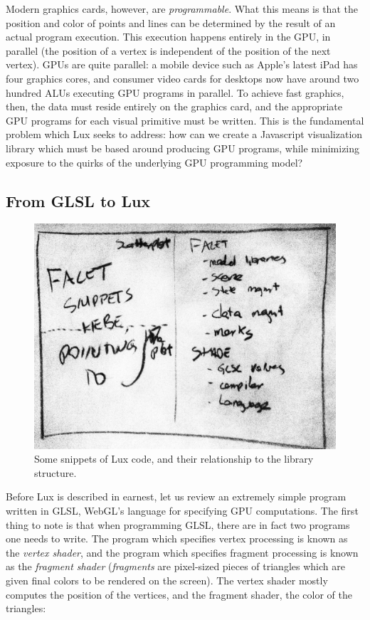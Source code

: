 Modern graphics cards, however, are \emph{programmable}. What this
means is that the position and color of points and lines can be
determined by the result of an actual program execution. This
execution happens entirely in the GPU, in parallel (the
position of a vertex is independent of the position of the next
vertex). GPUs are quite parallel: a mobile device
such as Apple's latest iPad has four graphics cores, and consumer
video cards for desktops now have around two hundred ALUs executing GPU programs in
parallel. To achieve fast graphics, then, the data must reside
entirely on the graphics card, and the appropriate GPU programs for each visual
primitive must be written. This is the fundamental problem
which Lux seeks to address: how can we create a Javascript
visualization library which must be based around producing
GPU programs, while minimizing exposure to the quirks of the
underlying GPU programming model?

\subsection{From GLSL to Lux}

\begin{figure}
\includegraphics[width=\linewidth]{fig/snippet_overview/overview.jpg}
\caption{Some snippets of Lux code, and their relationship to the
library structure.\label{fig:facetsnippet}}
\end{figure}

Before Lux is described in earnest, let us review an extremely
simple program written in GLSL, WebGL's language for specifying GPU
computations. The first thing to note is that when programming GLSL,
there are in fact two programs one needs to write. The program which
specifies vertex processing is known as the \emph{vertex shader}, and
the program which specifies fragment processing is known as
the \emph{fragment shader} (\emph{fragments} are pixel-sized pieces of
triangles which are given final colors to be rendered on the
screen). The vertex shader mostly computes the position of the vertices,
and the fragment shader, the color of the triangles:

